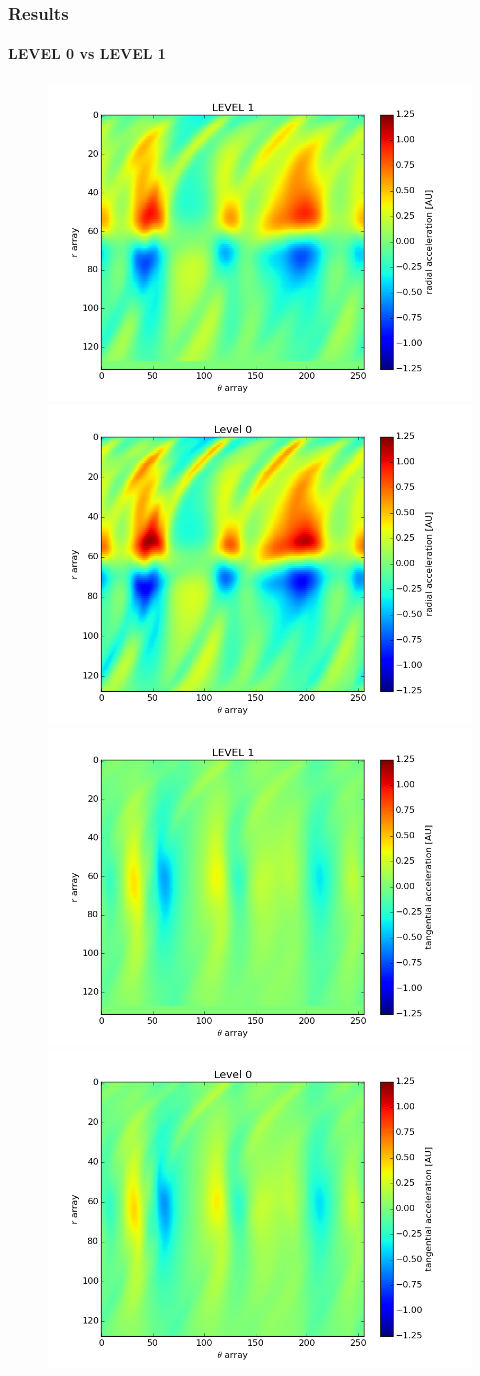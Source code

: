 \documentclass{beamer}
\begin{document}
\begin{frame}
\frametitle{Results}
\framesubtitle{LEVEL 0 vs LEVEL 1}
\begin{figure}
\includegraphics[width = .5\textwidth]{./level1_4_radial.png}
\includegraphics[width = .5\textwidth]{./level0_radial.png}
\newline
\includegraphics[width = .5\textwidth]{./level1_4_tangential.png}
\includegraphics[width = .5\textwidth]{./level0_tangential.png}
\end{figure}

 
\end{frame}
\end{document}
